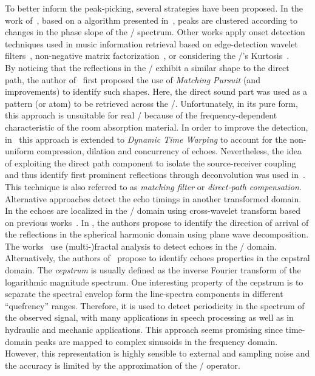 To better inform the peak-picking, several strategies have been proposed.
In the work of~, based on a algorithm presented in~, peaks are clustered according to changes in the phase slope of the \RIR/ spectrum.
Other works apply onset detection techniques used in music information retrieval based on edge-detection wavelet filters~, non-negative matrix factorization~, or considering the \RIR/'s Kurtosis~.
\\By noticing that the reflections in the \RIRs/ exhibit a similar shape to the direct path, the author of~ first proposed the use of \textit{Matching Pursuit} (and improvements) to identify such shapes.
Here, the direct sound part was used as a pattern (or atom) to be retrieved across the \RIR/.
Unfortunately, in its pure form, this approach is unsuitable for real \RIRs/ because of the frequency-dependent characteristic of the room absorption material.
In order to improve the detection, in~ this approach is extended to \textit{Dynamic Time Warping} to account for the non-uniform compression, dilation and concurrency of echoes.
Nevertheless, the idea of exploiting the direct path component to isolate the source-receiver coupling and thus identify first prominent reflections through deconvolution was used in~.
This technique is also referred to as \textit{matching filter} or \textit{direct-path compensation}.
\\Alternative approaches detect the echo timings in another transformed domain.
In  the echoes are localized in the \TFdef/ domain using cross-wavelet transform based on previous works~.
In , the authors propose to identify the direction of arrival of the reflections in the spherical harmonic domain using plane wave decomposition.
The works~ use (multi-)fractal analysis to detect echoes in the \TFdef/ domain.
Alternatively, the authors of~ propose to identify echoes properties in the cepstral domain.
The \textit{cepstrum} is usually defined as the inverse Fourier transform of the logarithmic magnitude spectrum. One interesting property of the cepstrum is to separate the spectral envelop form the line-spectra components in different ``quefrency'' ranges.
Therefore, it is used to detect periodicity in the spectrum of the observed signal, with many applications in speech processing as well as in hydraulic and mechanic applications.
This approach seems promising since time-domain peaks are mapped to complex sinusoids in the frequency domain.
However, this representation is highly sensible to external and sampling noise and the accuracy is limited by the approximation of the \DFT/ operator.

